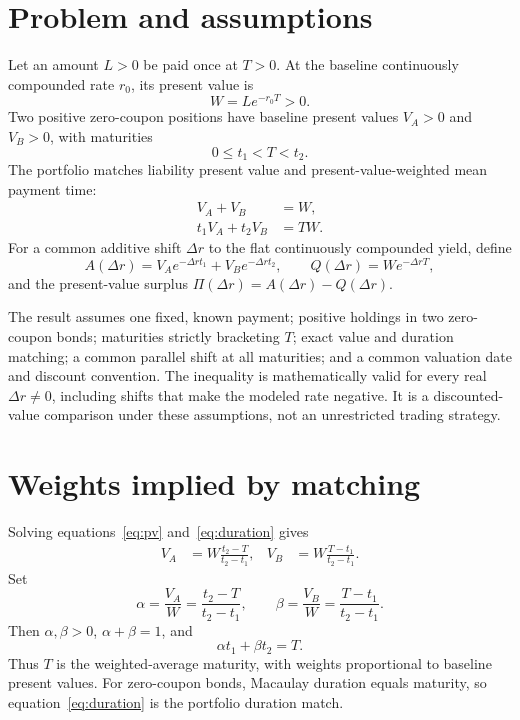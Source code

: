 \documentclass[11pt]{article}
\begin{document}
\section{Problem and assumptions}
Let an amount \(L>0\) be paid once at \(T>0\). At the baseline continuously compounded rate \(r_0\), its present value is
\[
 W=Le^{-r_0T}>0.
\]
Two positive zero-coupon positions have baseline present values \(V_A>0\) and \(V_B>0\), with maturities
\[
 0\leq t_1<T<t_2.
\]
The portfolio matches liability present value and present-value-weighted mean payment time:
\begin{align}
 V_A+V_B&=W, \label{eq:pv}\\
 t_1V_A+t_2V_B&=TW. \label{eq:duration}
\end{align}
For a common additive shift \(\Delta r\) to the flat continuously compounded yield, define
\[
 A(\Delta r)=V_Ae^{-\Delta r t_1}+V_Be^{-\Delta r t_2},\qquad
 Q(\Delta r)=We^{-\Delta r T},
\]
and the present-value surplus \(\Pi(\Delta r)=A(\Delta r)-Q(\Delta r)\).

The result assumes one fixed, known payment; positive holdings in two zero-coupon bonds; maturities strictly bracketing \(T\); exact value and duration matching; a common parallel shift at all maturities; and a common valuation date and discount convention. The inequality is mathematically valid for every real \(\Delta r\ne0\), including shifts that make the modeled rate negative. It is a discounted-value comparison under these assumptions, not an unrestricted trading strategy.

\section{Weights implied by matching}
Solving equations~\eqref{eq:pv} and~\eqref{eq:duration} gives
\begin{align}
 V_A&=W\frac{t_2-T}{t_2-t_1},&
 V_B&=W\frac{T-t_1}{t_2-t_1}. \label{eq:weights-values}
\end{align}
Set
\[
 \alpha=\frac{V_A}{W}=\frac{t_2-T}{t_2-t_1},\qquad
 \beta=\frac{V_B}{W}=\frac{T-t_1}{t_2-t_1}.
\]
Then \(\alpha,\beta>0\), \(\alpha+\beta=1\), and
\[
 \alpha t_1+\beta t_2=T.
\]
Thus \(T\) is the weighted-average maturity, with weights proportional to baseline present values. For zero-coupon bonds, Macaulay duration equals maturity, so equation~\eqref{eq:duration} is the portfolio duration match.
\end{document}
